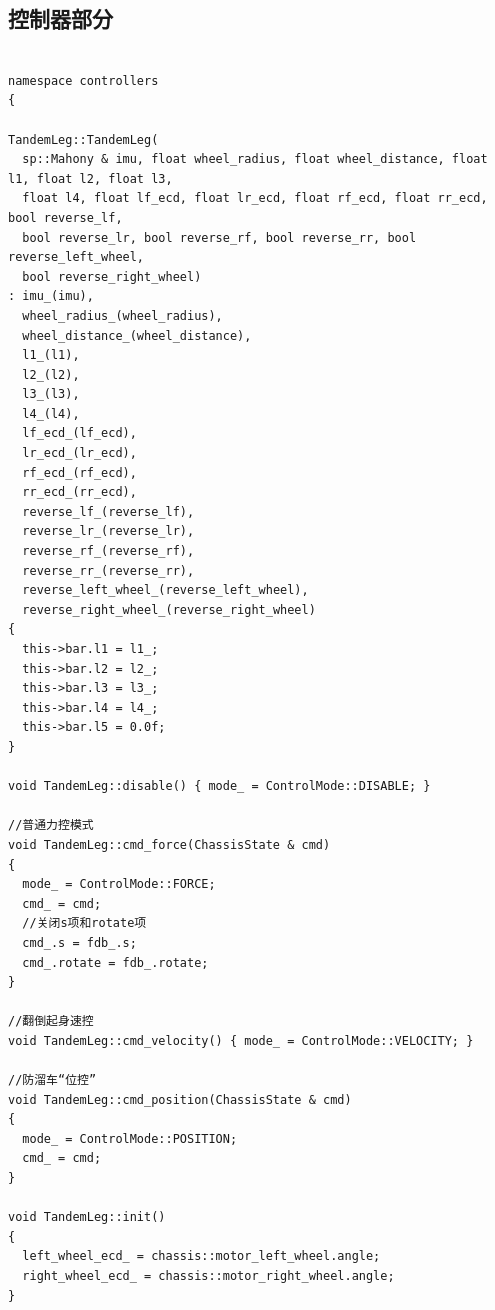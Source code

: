 \documentclass[
  oneside,
  degree=bachelor,
  fullwidthstop=false,
  fontset=fandol,
  times=false,
  minted=true,
  biblatex=true,
]{tongjithesis}
\begin{document}
\subsection{控制器部分}
\begin{verbatim}

namespace controllers
{

TandemLeg::TandemLeg(
  sp::Mahony & imu, float wheel_radius, float wheel_distance, float l1, float l2, float l3,
  float l4, float lf_ecd, float lr_ecd, float rf_ecd, float rr_ecd, bool reverse_lf,
  bool reverse_lr, bool reverse_rf, bool reverse_rr, bool reverse_left_wheel,
  bool reverse_right_wheel)
: imu_(imu),
  wheel_radius_(wheel_radius),
  wheel_distance_(wheel_distance),
  l1_(l1),
  l2_(l2),
  l3_(l3),
  l4_(l4),
  lf_ecd_(lf_ecd),
  lr_ecd_(lr_ecd),
  rf_ecd_(rf_ecd),
  rr_ecd_(rr_ecd),
  reverse_lf_(reverse_lf),
  reverse_lr_(reverse_lr),
  reverse_rf_(reverse_rf),
  reverse_rr_(reverse_rr),
  reverse_left_wheel_(reverse_left_wheel),
  reverse_right_wheel_(reverse_right_wheel)
{
  this->bar.l1 = l1_;
  this->bar.l2 = l2_;
  this->bar.l3 = l3_;
  this->bar.l4 = l4_;
  this->bar.l5 = 0.0f;
}

void TandemLeg::disable() { mode_ = ControlMode::DISABLE; }

//普通力控模式
void TandemLeg::cmd_force(ChassisState & cmd)
{
  mode_ = ControlMode::FORCE;
  cmd_ = cmd;
  //关闭s项和rotate项
  cmd_.s = fdb_.s;
  cmd_.rotate = fdb_.rotate;
}

//翻倒起身速控
void TandemLeg::cmd_velocity() { mode_ = ControlMode::VELOCITY; }

//防溜车“位控”
void TandemLeg::cmd_position(ChassisState & cmd)
{
  mode_ = ControlMode::POSITION;
  cmd_ = cmd;
}

void TandemLeg::init()
{
  left_wheel_ecd_ = chassis::motor_left_wheel.angle;
  right_wheel_ecd_ = chassis::motor_right_wheel.angle;
}


\end{verbatim}
\end{document}
